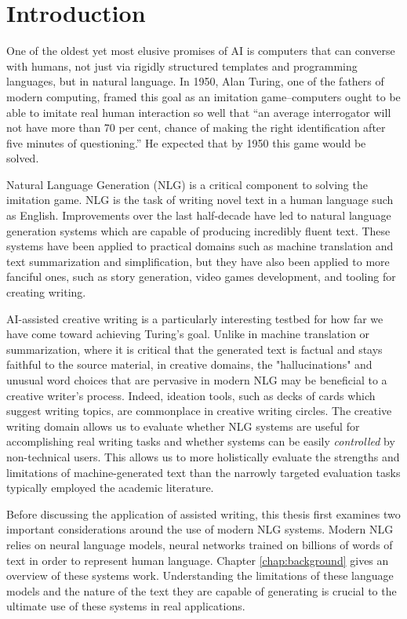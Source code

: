 \chapter{Introduction} \label{chap:intro}

One of the oldest yet most elusive promises of AI is computers that can converse with humans, not just via rigidly structured templates and programming languages, but in natural language.
In 1950, Alan Turing, one of the fathers of modern computing, framed this goal as an imitation game--computers ought to be able to imitate real human interaction so well that ``an average interrogator will not have more than 70 per cent, chance of making the right identification after five minutes of questioning.''
He expected that by 1950 this game would be solved.

Natural Language Generation (NLG) is a critical component to solving the imitation game.
NLG is the task of writing novel text in a human language such as English. 
Improvements over the last half-decade have led to natural language generation systems which are capable of producing incredibly fluent text.
These systems have been applied to practical domains such as machine translation and text summarization and simplification, but they have also been applied to more fanciful ones, such as story generation, video games development, and tooling for creating writing.

AI-assisted creative writing is a particularly interesting testbed for how far we have come toward achieving Turing's goal.
Unlike in machine translation or summarization, where it is critical that the generated text is factual and stays faithful to the source material, in creative domains, the "hallucinations" and unusual word choices that are pervasive in modern NLG may be beneficial to a creative writer's process.
Indeed, ideation tools, such as decks of cards which suggest writing topics, are commonplace in creative writing circles.
The creative writing domain allows us to evaluate whether NLG systems are useful for accomplishing real writing tasks and whether systems can be easily \textit{controlled} by non-technical users.
This allows us to more holistically evaluate the strengths and limitations of machine-generated text than the narrowly targeted evaluation tasks typically employed the academic literature.

Before discussing the application of assisted writing, this thesis first examines two important considerations around the use of modern NLG systems.
Modern NLG relies on neural language models, neural networks trained on billions of words of text in order to represent human language.
Chapter \ref{chap:background} gives an overview of these systems work. 
Understanding the limitations of these language models and the nature of the text they are capable of generating is crucial to the ultimate use of these systems in real applications.

